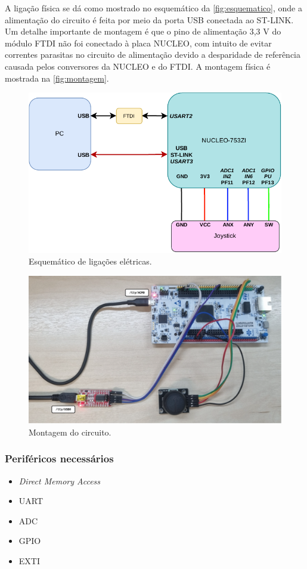 A ligação física se dá como mostrado no esquemático da \autoref{fig:esquematico}, onde a alimentação do circuito é feita por meio da porta USB conectada ao ST-LINK. Um detalhe importante de montagem é que o pino de alimentação 3,3 V do módulo FTDI não foi conectado à placa NUCLEO, com intuito de evitar correntes parasitas no circuito de alimentação devido a desparidade de referência causada pelos conversores da NUCLEO e do FTDI. A montagem física é mostrada na \autoref{fig:montagem}.

\begin{figure}[H]
	\centering
	\includegraphics[width=0.55\linewidth]{img/esquematico.pdf}
	\caption{Esquemático de ligações elétricas.}
	\label{fig:esquematico}
\end{figure}

\begin{figure}[H]
	\centering
	\includegraphics[width=0.7\linewidth]{img/montagem.pdf}
	\caption{Montagem do circuito.}
	\label{fig:montagem}
\end{figure}

\subsubsection*{Periféricos necessários}

\begin{itemize}
	\item \textit{Direct Memory Access}
	
	\item UART
	
	\item ADC
	
	\item GPIO
	
	\item EXTI
	
	
	
\end{itemize}


